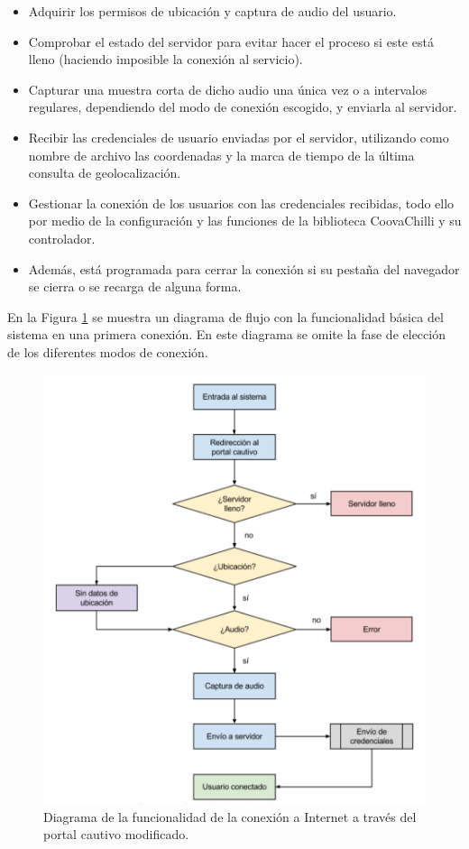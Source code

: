 \begin{itemize}
\item Adquirir los permisos de ubicación y captura de audio del usuario.
\item Comprobar el estado del servidor para evitar hacer el proceso si este está lleno (haciendo imposible la conexión al servicio).
\item Capturar una muestra corta de dicho audio una única vez o a intervalos regulares, dependiendo del modo de conexión escogido, y enviarla al servidor.
\item Recibir las credenciales de usuario enviadas por el servidor, utilizando como nombre de archivo las coordenadas y la marca de tiempo de la última consulta de geolocalización.
\item Gestionar la conexión de los usuarios con las credenciales recibidas, todo ello por medio de la configuración y las funciones de la biblioteca CoovaChilli y su controlador.
\item Además, está programada para cerrar la conexión si su pestaña del navegador se cierra o se recarga de alguna forma.
\end{itemize}

En la Figura \ref{flujoSistema} se muestra un diagrama de flujo con la funcionalidad básica del sistema en una primera conexión. En este diagrama se omite la fase de elección de los diferentes modos de conexión.

\begin{figure}[!t]
\begin{center}
\includegraphics[width=0.75\linewidth]{./4_AnalisisFuncional/Img/flujoSistema.png}
\end{center}
\caption{Diagrama de la funcionalidad de la conexión a Internet a través del portal cautivo modificado.}
\label{flujoSistema}
\end{figure}

